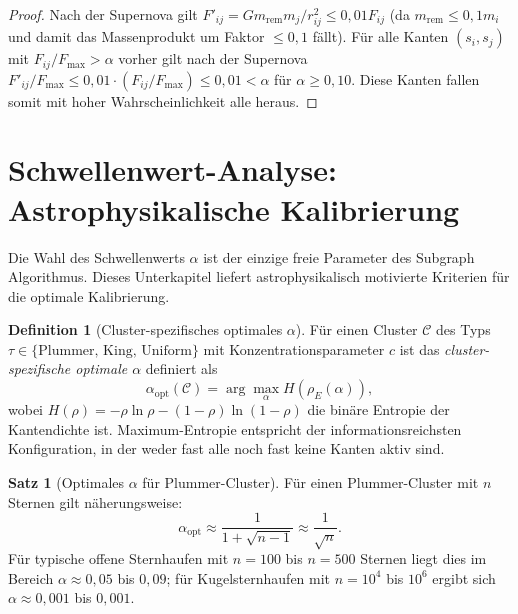 ﻿\documentclass[a4paper,12pt]{report}
\theoremstyle{definition}
\newtheorem{definition}{Definition}
\newtheorem{satz}{Satz}
\begin{document}
\begin{proof}
Nach der Supernova gilt $F'_{ij} = G m_\mathrm{rem} m_j / r_{ij}^2 \leq 0{,}01 F_{ij}$ (da $m_\mathrm{rem} \leq 0{,}1 m_i$ und damit das Massenprodukt um Faktor $\leq 0{,}1$ fällt). Für alle Kanten $(s_i, s_j)$ mit $F_{ij}/F_\mathrm{max} > \alpha$ vorher gilt nach der Supernova $F'_{ij}/F_\mathrm{max} \leq 0{,}01 \cdot (F_{ij}/F_\mathrm{max}) \leq 0{,}01 < \alpha$ für $\alpha \geq 0{,}10$. Diese Kanten fallen somit mit hoher Wahrscheinlichkeit alle heraus.
\end{proof}

\section{Schwellenwert-Analyse: Astrophysikalische Kalibrierung}
\label{sec:kalibrierung}

Die Wahl des Schwellenwerts $\alpha$ ist der einzige freie Parameter des Subgraph Algorithmus. Dieses Unterkapitel liefert astrophysikalisch motivierte Kriterien für die optimale Kalibrierung.

\begin{definition}[Cluster-spezifisches optimales $\alpha$]
\label{def:alpha_cluster}
Für einen Cluster $\mathcal{C}$ des Typs $\tau \in \{\mathrm{Plummer},\, \mathrm{King},\, \mathrm{Uniform}\}$ mit Konzentrations\-parameter $c$ ist das \emph{cluster-spezifische optimale $\alpha$} definiert als
\[
\alpha_\mathrm{opt}(\mathcal{C}) = \arg\max_{\alpha} H(\rho_E(\alpha)),
\]
wobei $H(\rho) = -\rho \ln \rho - (1-\rho)\ln(1-\rho)$ die binäre Entropie der Kantendichte ist. Maximum-Entropie entspricht der informationsreichsten Konfiguration, in der weder fast alle noch fast keine Kanten aktiv sind.
\end{definition}

\begin{satz}[Optimales $\alpha$ für Plummer-Cluster]
\label{satz:plummer_alpha}
Für einen Plummer-Cluster mit $n$ Sternen gilt näherungsweise:
\[
\alpha_\mathrm{opt} \approx \frac{1}{1 + \sqrt{n-1}} \approx \frac{1}{\sqrt{n}}.
\]
Für typische offene Sternhaufen mit $n = 100$ bis $n = 500$ Sternen liegt dies im Bereich $\alpha \approx 0{,}05$ bis $0{,}09$; für Kugelsternhaufen mit $n = 10^4$ bis $10^6$ ergibt sich $\alpha \approx 0{,}001$ bis $0{,}001$.
\end{satz}
\end{document}
